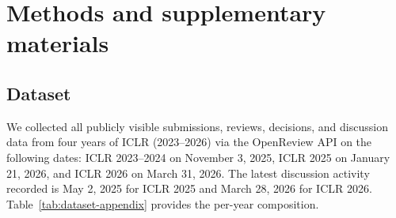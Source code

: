 \documentclass{article}
\begin{document}


\appendix

\section{Methods and supplementary materials}\label{app:methods}

\subsection{Dataset}\label{app:dataset}

We collected all publicly visible submissions, reviews, decisions, and discussion data from four years of ICLR (2023--2026) via the OpenReview API on the following dates: ICLR 2023--2024 on November 3, 2025, ICLR 2025 on January 21, 2026, and ICLR 2026 on March 31, 2026. The latest discussion activity recorded is May 2, 2025 for ICLR 2025 and March 28, 2026 for ICLR 2026. Table~\ref{tab:dataset-appendix} provides the per-year composition.
\end{document}
